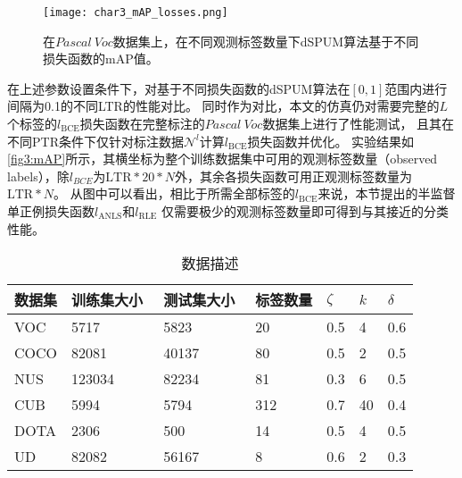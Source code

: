 \begin{figure}[htbp]
    \centering
    \texttt{[image: char3\_mAP\_losses.png]}
    \caption{\label{fig3:mAP}{在$Pascal~Voc$数据集上，在不同观测标签数量下dSPUM算法基于不同损失函数的mAP值。}}
\end{figure}
在上述参数设置条件下，对基于不同损失函数的dSPUM算法在$\left[0,1\right]$范围内进行间隔为0.1的不同LTR的性能对比。
同时作为对比，本文的仿真仍对需要完整的$L$个标签的$l_{\mathrm{BCE}}$损失函数在完整标注的$Pascal~Voc$数据集上进行了性能测试，
且其在不同PTR条件下仅针对标注数据$\mathcal{N}^l$计算$l_{\mathrm{BCE}}$损失函数并优化。
实验结果如\autoref{fig3:mAP}所示，其横坐标为整个训练数据集中可用的观测标签数量（observed labels），除$l_{BCE}$为$\mathrm{LTR}*20*N$外，其余各损失函数可用正观测标签数量为$\mathrm{LTR}*N$。
从图中可以看出，相比于所需全部标签的$l_{\mathrm{BCE}}$来说，本节提出的半监督单正例损失函数$l_{\mathrm{ANLS}}$和$l_{\mathrm{RLE}}$
仅需要极少的观测标签数量即可得到与其接近的分类性能。

\begin{table}[htbp]
    \caption{\label{char3:tab:data_description}数据描述}
    \begin{tabularx}{\textwidth}{XXXXXXX}
        \hline
        数据集 & 训练集大小$~~$ & 测试集大小$~~$ & 标签数量 & $\zeta$ & $k$ & $\delta$\\ \hline
        VOC & 5717 & 5823 & 20 &  0.5 & 4 & 0.6\\
        COCO & 82081 & 40137 & 80 &  0.5 & 2 & 0.5\\
        NUS & 123034 & 82234  & 81 & 0.3 & 6 & 0.5\\
        CUB & 5994 & 5794 & 312 &  0.7 & 40 & 0.4\\
        DOTA & 2306 & 500 & 14 &  0.5 & 4 & 0.5\\ 
        UD & 82082 & 56167 & 8 &  0.6 & 2 & 0.3\\ \hline
    \end{tabularx}
\end{table}


